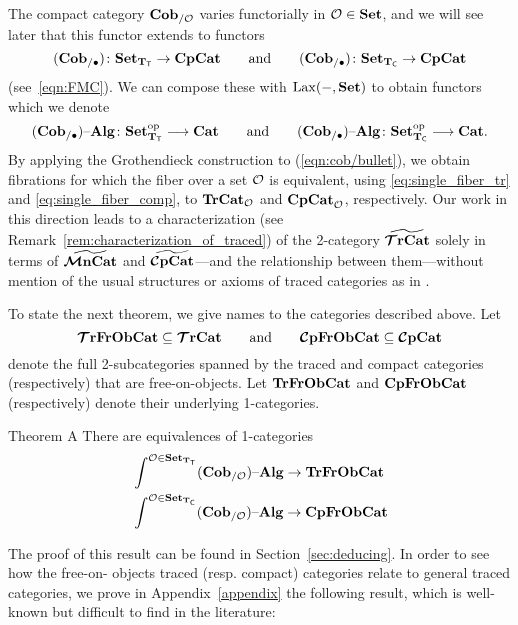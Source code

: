 \documentclass[11pt,oneside,article]{memoir}
\begin{document}
The compact category $\mathbf{Cob}_{/\mathcal{O}}$ varies functorially in $\mathcal{O}\in\mathbf{Set}$, and we will see later
that this functor extends to functors
\begin{equation*}
   (\mathbf{Cob}_{/\bullet})\colon\mathbf{Set}_{\mathbf{T}_{\mathsf{T}}}\to\mathbf{CpCat}\qquad\text{and}
   \qquad
   (\mathbf{Cob}_{/\bullet})\colon\mathbf{Set}_{\mathbf{T}_{\mathsf{C}}}\to\mathbf{CpCat}
\end{equation*}
(see~\eqref{eqn:FMC}). We can compose these with $\operatorname{Lax}(-,\mathbf{Set})$ to obtain functors which we denote
\begin{equation}\label{eqn:cob/bullet}
   (\mathbf{Cob}_{/\bullet}){\text \textendash}\mathbf{Alg}\colon\mathbf{Set}_{\mathbf{T}_{\mathsf{T}}}^{\mathrm{op}}\longrightarrow\mathbf{Cat}
   \qquad\text{and}\qquad
   (\mathbf{Cob}_{/\bullet}){\text \textendash}\mathbf{Alg}\colon\mathbf{Set}_{\mathbf{T}_{\mathsf{C}}}^{\mathrm{op}}\longrightarrow\mathbf{Cat}.
\end{equation}
By applying the Grothendieck construction to (\ref{eqn:cob/bullet}), we obtain fibrations for which
the fiber over a set $\mathcal{O}$ is equivalent, using \eqref{eq:single_fiber_tr} and
\eqref{eq:single_fiber_comp}, to $\mathbf{TrCat}_{\mathcal{O}}$ and $\mathbf{CpCat}_{\mathcal{O}}$, respectively. Our work in this direction leads to a characterization (see Remark~\ref{rem:characterization_of_traced}) of the 2-category $\widetilde{\bm{\mathcal{T}}\mathbf{rCat}}$ solely in terms of $\widetilde{\bm{\mathcal{M}}\mathbf{nCat}}$ and $\widetilde{\bm{\mathcal{C}}\mathbf{pCat}}$---and the relationship between them---without mention of the usual structures or axioms of traced categories as in \cite{JoyalStreetVerity}.

To state the next theorem, we give names to the categories described above. Let 
$$\bm{\mathcal{T}}\mathbf{rFrObCat}\subseteq\bm{\mathcal{T}}\mathbf{rCat} \qquad \text{and} \qquad \bm{\mathcal{C}}\mathbf{pFrObCat}\subseteq\bm{\mathcal{C}}\mathbf{pCat}$$ 
denote the full 2-subcategories spanned by the traced and compact categories (respectively) that are free-on-objects. Let $\mathbf{TrFrObCat}$ and $\mathbf{CpFrObCat}$ (respectively) denote their underlying 1-categories. 

\begin{named}{Theorem A}\label{thm:TheoremA_statement}
  There are equivalences of 1-categories
  \begin{align*}
     &\int^{\mathcal{O}\in\mathbf{Set}_{\mathbf{T}_{\mathsf{T}}}}(\mathbf{Cob}_{/\mathcal{O}}){\text \textendash}\mathbf{Alg} \to \mathbf{TrFrObCat}
     \\
     &\int^{\mathcal{O}\in\mathbf{Set}_{\mathbf{T}_{\mathsf{C}}}}(\mathbf{Cob}_{/\mathcal{O}}){\text \textendash}\mathbf{Alg} \to \mathbf{CpFrObCat}
  \end{align*}
  
\end{named}

The proof of this result can be found in Section~\ref{sec:deducing}. In order to see how the free-on- objects traced (resp. compact) categories relate to general traced categories, we prove in Appendix~\ref{appendix} the following result, which is well-known but difficult to find in the literature:
\end{document}
